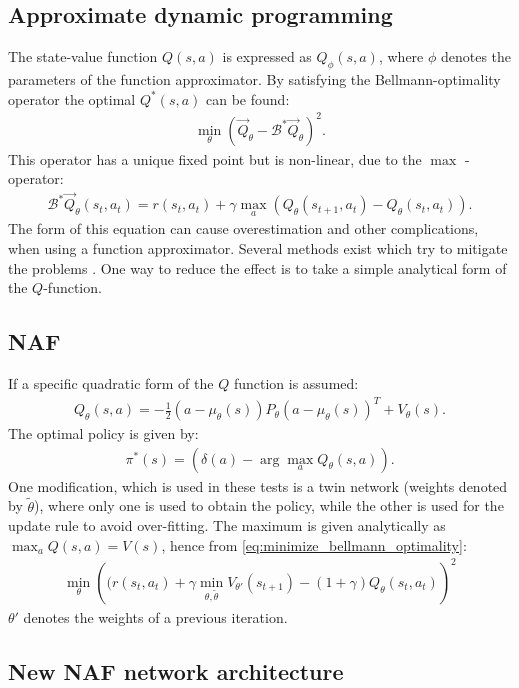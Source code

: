 \documentclass[
 reprint,
 amsmath,amssymb,amsfonts,clevref,
 aps,
prstab,
]{revtex4-2}
\begin{document}
\subsection{Approximate dynamic programming}
The state-value function $Q(s,a)$ is expressed as $Q_\phi(s,a)$, where $\phi$ denotes the parameters of the function approximator. By satisfying the Bellmann-optimality operator the optimal $Q^*(s,a)$ can be found:
\begin{align}
    \min_\theta \left(\vec Q_\theta - \mathcal{B}^*\vec Q_\theta\right)^2.\label{eq:minimize_bellmann_optimality}
\end{align}
This operator has a unique fixed point but is non-linear, due to the $\max$ - operator:
\begin{align}
 \mathcal{B}^*\vec Q_\theta(s_t,a_t) = r(s_t,a_t)+\gamma\max_a\left( Q_\theta(s_{t+1},a_t) - Q_\theta(s_t,a_t)\right).
\end{align}
The form of this equation can cause overestimation and other complications, when using a function approximator. Several methods exist which try to mitigate the problems \cite{}.
One way to reduce the effect is to take a simple analytical form of the $Q$-function.
\subsection{NAF}
If a specific quadratic form of the $Q$ function is assumed:
\begin{align}
     Q_\theta(s,a) = -\frac{1}{2}(a-\mu_\theta(s))P_\theta(a-\mu_\theta(s))^T+V_\theta(s).
\end{align}
 The optimal policy is given by:
\begin{align}
    \pi^*(s)=(\delta(a)-\arg\!\max_a Q_\theta(s,a)).
\end{align}
One modification, which is used in these tests is a twin network (weights denoted by $\tilde\theta$), where only one is used to obtain the policy, while the other is used for the update rule to avoid over-fitting.
The maximum is given analytically as $\max_a Q(s,a) = V(s)$, hence from \cref{eq:minimize_bellmann_optimality}:
\begin{align}
	\min_\theta\left( (r(s_t,a_t)+\gamma \min_{\theta,\tilde \theta} V_{\theta\prime}(s_{t+1}) - (1+\gamma) Q_\theta(s_t,a_t)\right)^2
\end{align}
$\theta\prime$ denotes the weights of a previous iteration.
\subsection{New NAF network architecture}
\end{document}
